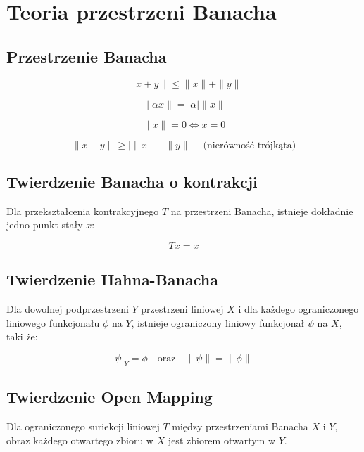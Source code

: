 \documentclass{article}
\begin{document}
\section*{Teoria przestrzeni Banacha}

\subsection*{Przestrzenie Banacha}

\[
    \|x + y\| \leq \|x\| + \|y\|
\]

\[
    \| \alpha x \| = |\alpha| \|x\|
\]

\[
    \|x\| = 0 \iff x = 0
\]

\[
    \|x - y\| \geq |\|x\| - \|y\|| \quad \text{(nierówność trójkąta)}
\]

\subsection*{Twierdzenie Banacha o kontrakcji}

Dla przekształcenia kontrakcyjnego $T$ na przestrzeni Banacha, istnieje dokładnie jedno punkt stały $x$:

\[
    Tx = x
\]

\subsection*{Twierdzenie Hahna-Banacha}

Dla dowolnej podprzestrzeni $Y$ przestrzeni liniowej $X$ i dla każdego ograniczonego liniowego funkcjonału $\phi$ na $Y$, istnieje ograniczony liniowy funkcjonał $\psi$ na $X$, taki że:

\[
    \psi|_Y = \phi \quad \text{oraz} \quad \|\psi\| = \|\phi\|
\]

\subsection*{Twierdzenie Open Mapping}

Dla ograniczonego suriekcji liniowej $T$ między przestrzeniami Banacha $X$ i $Y$, obraz każdego otwartego zbioru w $X$ jest zbiorem otwartym w $Y$.
\end{document}
